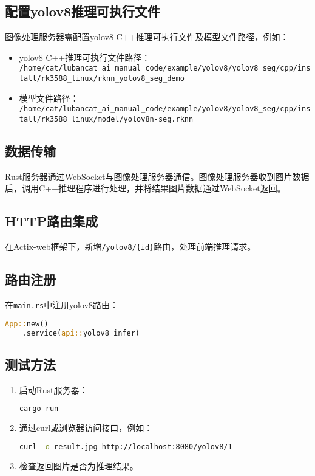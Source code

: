 \subsection{配置yolov8推理可执行文件}
图像处理服务器需配置yolov8 C++推理可执行文件及模型文件路径，例如：
\begin{itemize}
    \item yolov8 C++推理可执行文件路径：\\
    \lstinline[breaklines=true]|/home/cat/lubancat_ai_manual_code/example/yolov8/yolov8_seg/cpp/install/rk3588_linux/rknn_yolov8_seg_demo|
    \item 模型文件路径：\\
    \lstinline[breaklines=true]|/home/cat/lubancat_ai_manual_code/example/yolov8/yolov8_seg/cpp/install/rk3588_linux/model/yolov8n-seg.rknn|
\end{itemize}
\subsection{数据传输}
Rust服务器通过WebSocket与图像处理服务器通信。图像处理服务器收到图片数据后，调用C++推理程序进行处理，并将结果图片数据通过WebSocket返回。

\subsection{HTTP路由集成}

在Actix-web框架下，新增\texttt{/yolov8/\{id\}}路由，处理前端推理请求。

\subsection{路由注册}

在\texttt{main.rs}中注册yolov8路由：

\begin{lstlisting}[language=Rust]
App::new()
    .service(api::yolov8_infer)
\end{lstlisting}

\subsection{测试方法}

\begin{enumerate}
    \item 启动Rust服务器：
    \begin{lstlisting}[language=bash]
cargo run
    \end{lstlisting}
    \item 通过curl或浏览器访问接口，例如：
    \begin{lstlisting}[language=bash]
curl -o result.jpg http://localhost:8080/yolov8/1
    \end{lstlisting}
    \item 检查返回图片是否为推理结果。
\end{enumerate}

